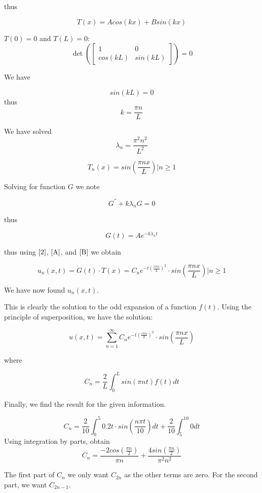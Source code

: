 \documentclass{article}
\begin{document}
thus

$$T(x) = Acos(kx)+Bsin(kx)$$

$T(0)=0$ and $T(L)=0$:
$$\det \left( \begin{bmatrix} 1 & 0 \\ cos(kL) & sin(kL) \end{bmatrix} \right) = 0$$

We have

$$sin(kL) =0$$ thus $$k=\frac{\pi n}{L}$$

We have solved $$ \lambda_n = \frac{\pi^2n^2}{L^2} $$

\begin{equation}\label{A}
T_n(x) = sin(\frac{\pi n x}{L}) \Bigr| n \geq 1
\end{equation}


Solving for function $G$ we note


$$G^{''}+k\lambda_nG = 0$$

thus

\begin{equation}\label{B}
G(t) = Ae^{-k\lambda_nt}
\end{equation}

thus using $\eqref{2}$, $\eqref{A}$, and $\eqref{B}$ we obtain


$$
u_n(x,t) = G(t) \cdot T(x) = C_n e^{-t\left(\frac{c \pi n}{L}\right)^2} \cdot sin\left(\frac{\pi n x}{L}\right) \Bigr| n \geq 1
$$


We have now found $u_n(x,t)$.

This is clearly the solution to the odd expansion of a function $f(t)$. Using the principle of superposition, we have the solution:

$$u(x,t) = \sum_{n=1}^{\infty} C_n e^{-t\left(\frac{c \pi n}{L}\right)^2} \cdot sin\left(\frac{\pi n x}{L}\right) $$

where

$$C_n = \frac{2}{L} \int_{0}^{L} sin(\pi n t)f(t)dt$$



Finally, we find the result for the given information.

$$C_n = \frac{2}{10} \int_{0}^{5} 0.2t \cdot sin\left(\frac{n \pi t}{10}\right) dt + \frac{2}{10} \int_{5}^{10} 0 dt$$
Using integration by parts, obtain
$$C_n = \frac{-2cos\left(\frac{\pi n}{2}\right)}{\pi n} + \frac{4sin\left(\frac{\pi n}{2}\right)}{\pi^2 n^2}$$

The first part of $C_n$ we only want $C_{2n}$ as the other terms are zero. For the second part, we want $C_{2n-1}$.
\end{document}
